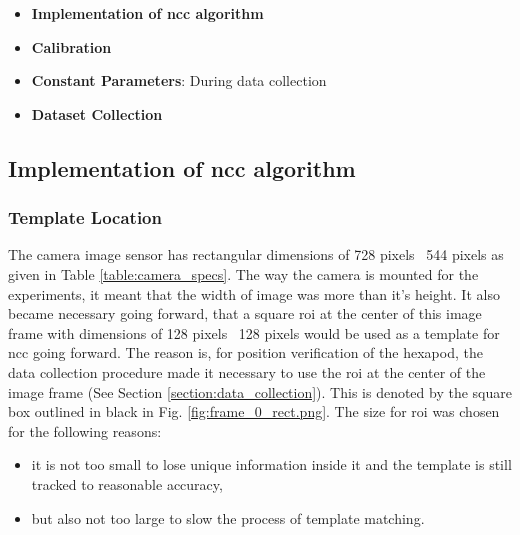 \begin{itemize}
    \item \textbf{Implementation of \gls{ncc} algorithm}
    \item \textbf{Calibration}
    \item \textbf{Constant Parameters}: During data collection 
    \item \textbf{Dataset Collection}
\end{itemize}


\subsection{Implementation of \gls{ncc} algorithm}\label{section:code_logic}
    \subsubsection*{Template Location}
        The camera image sensor has rectangular dimensions of 728 pixels \times \ 544 pixels as given in Table \ref{table:camera_specs}. The way the camera is mounted for the experiments, it meant that the width of image was more than it's height. It also became necessary going forward, that a square \gls{roi} at the center of this image frame with dimensions of 128 pixels \times \ 128 pixels would be used as a template for \gls{ncc} going forward. The reason is, for position verification of the hexapod, the data collection procedure made it necessary to use the \gls{roi} at the center of the image frame (See Section \ref{section:data_collection}). This is denoted by the square box outlined in black in Fig. \ref{fig:frame_0_rect.png}. The size for \gls{roi} was chosen for the following reasons:
        \begin{itemize}
            \item it is not too small to lose unique information inside it and the template is still tracked to reasonable accuracy,
            \item but also not too large to slow the process of template matching.
        \end{itemize}
        
